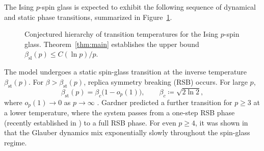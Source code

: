 \documentclass[letterpaper, DIV=17]{scrartcl}
\numberwithin{equation}{section}
\theoremstyle{definition}
\begin{document}
\noindent
The Ising $p$-spin glass is expected to exhibit the following sequence of dynamical and static phase transitions, summarized in Figure~\ref{fig:beta-phases}.
\begin{figure}[H]
  \centering
  \caption{Conjectured hierarchy of transition temperatures for the Ising $p$-spin glass. Theorem~\ref{thm:main} establishes the upper bound  $ \beta_{\text{sl}}(p) \leq C (\ln p )/p $.}
  \label{fig:beta-phases}
\end{figure}

\bigskip 
\noindent
The model undergoes a static spin-glass transition at the inverse temperature $\beta_{\mathrm{st}}(p)$. For $\beta>\beta_{\mathrm{st}}(p)$, replica symmetry breaking (RSB) occurs. For large $p$,
\[
    \beta_{\mathrm{st}}(p)=\beta_c\bigl(1-o_p(1)\bigr),\qquad
    \beta_c\coloneqq\sqrt{2\ln 2},
\]
where $o_p(1)\to0$ as $p\to\infty$ \cite{Bov06,G85,Z24}.
Gardner \cite{G85} predicted a further transition for $p\ge 3$ at a lower temperature, where the system passes from a one-step RSB phase (recently established in \cite{Z24}) to a full RSB phase. For even $p\geq 4$, it was shown in \cite{BJ18} that the Glauber dynamics mix exponentially slowly throughout the spin-glass regime.
\end{document}
